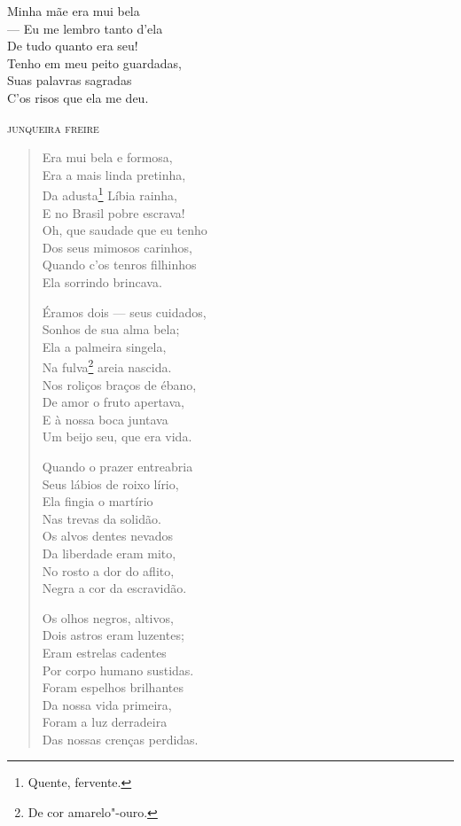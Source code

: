 {\setlength{\epigraphwidth}{.45\textwidth}
\epigraph{Minha mãe era mui bela\\
--- Eu me lembro tanto d'ela\\
De tudo quanto era seu!\\
Tenho em meu peito guardadas,\\
Suas palavras sagradas\\
C'os risos que ela me deu.}{\textsc{junqueira freire}\footnotemark}}

\begin{verse}
Era mui bela e formosa,\\
Era a mais linda pretinha,\\
Da adusta\footnote{Quente, fervente.} Líbia rainha,\\
E no Brasil pobre escrava!\\
Oh, que saudade que eu tenho\\
Dos seus mimosos carinhos,\\
Quando c'os tenros filhinhos\\
Ela sorrindo brincava.

Éramos dois --- seus cuidados,\\
Sonhos de sua alma bela;\\
Ela a palmeira singela,\\
Na fulva\footnote{De cor amarelo"-ouro.} areia nascida.\\
Nos roliços braços de ébano,\\
De amor o fruto apertava,\\
E à nossa boca juntava\\
Um beijo seu, que era vida.

Quando o prazer entreabria\\
Seus lábios de roixo lírio,\\
Ela fingia o martírio\\
Nas trevas da solidão.\\
Os alvos dentes nevados\\
Da liberdade eram mito,\\
No rosto a dor do aflito,\\
Negra a cor da escravidão.

Os olhos negros, altivos,\\
Dois astros eram luzentes;\\
Eram estrelas cadentes\\
Por corpo humano sustidas.\\
Foram espelhos brilhantes\\
Da nossa vida primeira,\\
Foram a luz derradeira\\
Das nossas crenças perdidas.


\end{verse}
